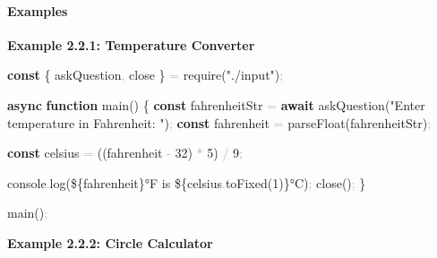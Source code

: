 \documentclass[
  justified,
  openright,
]{tufte-book}
\let\subsection\paragraph
\let\paragraph\paragraph
\newcommand{\KeywordTok}[1]{\textcolor{CodeKeyword}{\textbf{#1}}}  %
\newcommand{\StringTok}[1]{\textcolor{CodeString}{#1}}              %
\newcommand{\CodeNumTok}[1]{\textcolor{CodeNumber}{#1}}             %
\newcommand{\CodeFuncTok}[1]{\textcolor{CodeKeyword}{#1}}           %
\newcommand{\CodeAccentTok}[1]{\textcolor{CodeAccent}{#1}}          %
\newcommand{\OperatorTok}[1]{\textcolor{DarkGray}{#1}}              %
\newenvironment{Shaded}{%
  \begin{mdframed}[style=TufteCode]%
}{%
  \end{mdframed}%
}
\let\subsection\paragraph
\let\paragraph\paragraph
\begin{document}
\subsection{Examples}\label{examples-15}

\textbf{Example 2.2.1: Temperature Converter}

\begin{Shaded}
\begin{Highlighting}[]
\KeywordTok{const} \{ askQuestion\OperatorTok{,} close \} \OperatorTok{=} \CodeAccentTok{require}(\StringTok{"./input"})\OperatorTok{;}
 
\KeywordTok{async} \KeywordTok{function} \CodeFuncTok{main}() \{
  \KeywordTok{const} fahrenheitStr \OperatorTok{=} \KeywordTok{await} \CodeFuncTok{askQuestion}(\StringTok{"Enter temperature in Fahrenheit: "})\OperatorTok{;}
  \KeywordTok{const} fahrenheit \OperatorTok{=} \CodeAccentTok{parseFloat}(fahrenheitStr)\OperatorTok{;}
 
  \KeywordTok{const} celsius \OperatorTok{=} ((fahrenheit \OperatorTok{{-}} \CodeNumTok{32}) \OperatorTok{*} \CodeNumTok{5}) \OperatorTok{/} \CodeNumTok{9}\OperatorTok{;}
 
  console\OperatorTok{.}\CodeFuncTok{log}(\StringTok{\textasciigrave{}}\StringTok{\$\{}fahrenheit\StringTok{\}}\StringTok{°F is }\StringTok{\$\{}celsius\OperatorTok{.}\CodeFuncTok{toFixed}(\CodeNumTok{1})\StringTok{\}}\StringTok{°C\textasciigrave{}})\OperatorTok{;}
  \CodeFuncTok{close}()\OperatorTok{;}
\}
 
\CodeFuncTok{main}()\OperatorTok{;}
\end{Highlighting}
\end{Shaded}

\textbf{Example 2.2.2: Circle Calculator}
\end{document}
